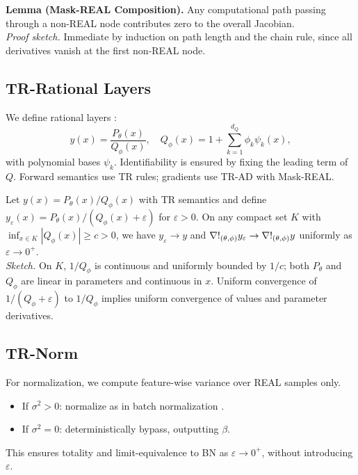 \documentclass[11pt,twoside]{article}
\begin{document}
\textbf{Lemma (Mask-REAL Composition).} Any computational path passing through a non-REAL node contributes zero to the overall Jacobian.  \\
\emph{Proof sketch.} Immediate by induction on path length and the chain rule, since all derivatives vanish at the first non-REAL node.

\subsection{TR-Rational Layers}
We define rational layers \citep{boulle2020rational}:
\[
y(x) = \frac{P_\theta(x)}{Q_\phi(x)}, \quad 
Q_\phi(x) = 1 + \sum_{k=1}^{d_Q} \phi_k \psi_k(x),
\]
with polynomial bases $\psi_k$. Identifiability is ensured by fixing the leading term of $Q$. Forward semantics use TR rules; gradients use TR-AD with Mask-REAL.

\begin{proposition}\label{prop:epslimit}
Let $y(x)=P_\theta(x)/Q_\phi(x)$ with TR semantics and define $y_\varepsilon(x)=P_\theta(x)/(Q_\phi(x)+\varepsilon)$ for $\varepsilon>0$. On any compact set $K$ with $\inf_{x\in K}|Q_\phi(x)|\ge c>0$, we have $y_\varepsilon \to y$ and $\nabla \\!_{(\theta,\phi)} y_\varepsilon \to \nabla \\!_{(\theta,\phi)} y$ uniformly as $\varepsilon\to 0^+$. \\ \emph{Sketch.} On $K$, $1/Q_\phi$ is continuous and uniformly bounded by $1/c$; both $P_\theta$ and $Q_\phi$ are linear in parameters and continuous in $x$. Uniform convergence of $1/(Q_\phi+\varepsilon)$ to $1/Q_\phi$ implies uniform convergence of values and parameter derivatives.
\end{proposition}

\subsection{TR-Norm}
For normalization, we compute feature-wise variance over REAL samples only.
\begin{itemize}
  \item If $\sigma^2 > 0$: normalize as in batch normalization \citep{ioffe2015batchnorm}.
  \item If $\sigma^2 = 0$: deterministically bypass, outputting $\beta$.
\end{itemize}

This ensures totality and limit-equivalence to BN as $\varepsilon \to 0^+$, without introducing $\varepsilon$.
\end{document}
